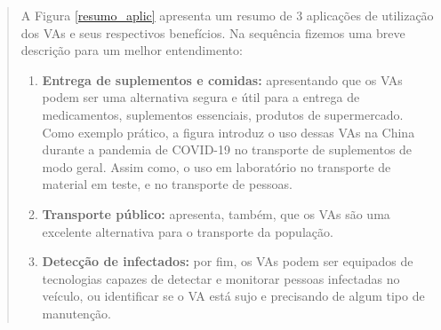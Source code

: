 \begin{quote}
A Figura \ref{resumo_aplic} apresenta um resumo de 3 aplicações de utilização dos VAs e seus respectivos benefícios. Na sequência fizemos uma breve descrição para um melhor entendimento:
\begin{enumerate}
 \item \textbf{Entrega de suplementos e comidas:} apresentando que os VAs podem ser uma alternativa segura e útil para a entrega de medicamentos, suplementos essenciais, produtos de supermercado. Como exemplo prático, a figura introduz o uso dessas VAs na China durante a pandemia de COVID-19 no transporte de suplementos de modo geral. Assim como, o uso em laboratório no transporte de material em teste, e no transporte de pessoas.
\item \textbf{Transporte público:} apresenta, também, que os VAs são uma excelente alternativa para o transporte da população. 
\item \textbf{Detecção de infectados:} por fim, os VAs podem ser equipados de tecnologias capazes de detectar e monitorar pessoas infectadas no veículo, ou identificar se o VA está sujo e precisando de algum tipo de manutenção. 
\end{enumerate}
\end{quote}

